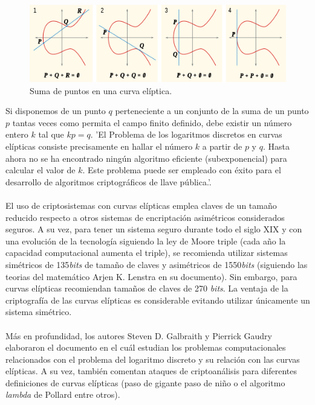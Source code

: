 \documentclass[../PFC.tex]{subfiles}
\begin{document}
\begin{figure}[H]
  \centering
  \includegraphics[width=1\textwidth]{./img/ECC}
  \caption{Suma de puntos en una curva elíptica.}
  \label{img:ecc}
\end{figure}

Si disponemos de un punto $q$ perteneciente a un conjunto de la suma de un punto $p$ tantas veces como permita el campo finito definido, debe existir un número entero $k$ tal que $kp = q$. 'El Problema de los logaritmos discretos en curvas elípticas consiste precisamente en hallar el número $k$ a partir de $p$ y $q$. Hasta ahora no se ha encontrado ningún algoritmo eficiente (subexponencial) para calcular el valor de $k$. Este problema puede ser empleado con éxito para el desarrollo de algoritmos criptográficos de llave pública.'\cite{lucena}.
\\\\
El uso de criptosistemas con curvas elípticas emplea claves de un tamaño reducido respecto a otros sistemas de encriptación asimétricos considerados seguros. A su vez, para tener un sistema seguro durante todo el siglo XIX y con una evolución de la tecnología siguiendo la ley de Moore triple (cada año la capacidad computacional aumenta el triple), se recomienda utilizar sistemas simétricos de 135\textit{bits} de tamaño de claves y asimétricos de 1550\textit{bits} (siguiendo las teorias del matemático Arjen K. Lenstra en su documento\cite{lenstra}). Sin embargo, para curvas elípticas recomiendan tamaños de claves de 270 \textit{bits}. La ventaja de la criptografía de las curvas elípticas es considerable evitando utilizar únicamente un sistema simétrico\cite{keylength}.
\\\\
Más en profundidad, los autores Steven D. Galbraith y Pierrick Gaudry elaboraron el documento \cite{galbraith2016recent} en el cuál estudian los problemas computacionales relacionados con el problema del logaritmo discreto y su relación con las curvas elípticas. A su vez, también comentan ataques de criptoanálisis para diferentes definiciones de curvas elípticas (paso de gigante paso de niño o el algoritmo \textit{lambda} de Pollard entre otros).
\end{document}
